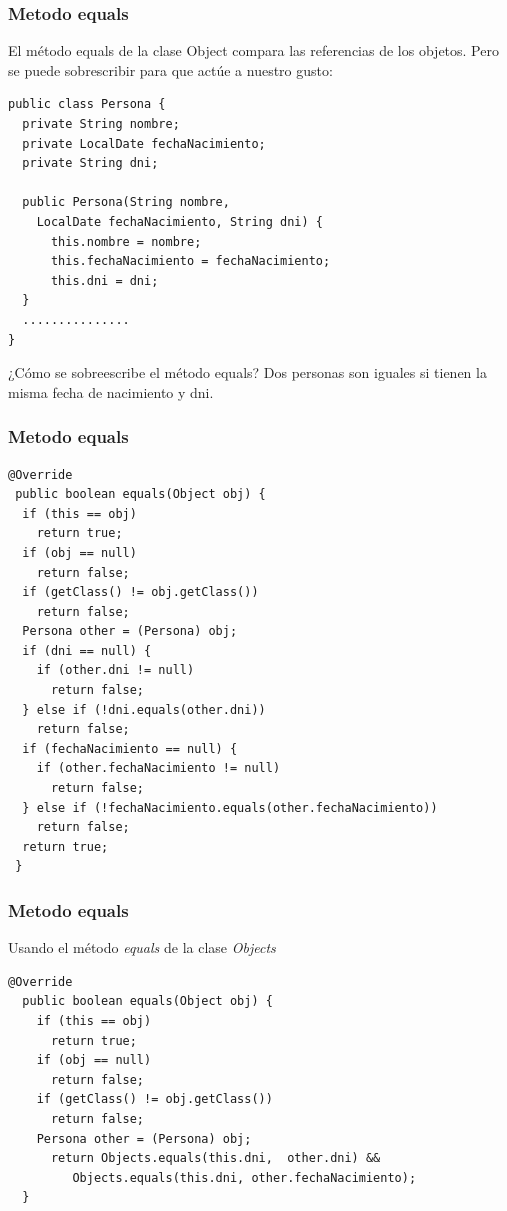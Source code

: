 \documentclass{beamer}
\begin{document}
\begin{frame}[fragile]
\frametitle{Metodo equals}
El método \alert{equals} de la clase Object compara las referencias de los objetos. Pero se puede sobrescribir para que actúe a nuestro gusto:
\pause
\begin{verbatim}
public class Persona {
  private String nombre;
  private LocalDate fechaNacimiento;
  private String dni;
	
  public Persona(String nombre, 
    LocalDate fechaNacimiento, String dni) {
      this.nombre = nombre;
      this.fechaNacimiento = fechaNacimiento;
      this.dni = dni;
  }
  ...............	
}
\end{verbatim}
\pause
¿Cómo se sobreescribe el método equals? Dos personas son iguales si tienen la misma fecha de nacimiento y dni.
\end{frame}


\begin{frame}[fragile]
\frametitle{Metodo equals}
\begin{footnotesize}
\begin{verbatim}
@Override
 public boolean equals(Object obj) {
  if (this == obj)
    return true;
  if (obj == null)
    return false;
  if (getClass() != obj.getClass())
    return false;
  Persona other = (Persona) obj;
  if (dni == null) {
    if (other.dni != null)
      return false;
  } else if (!dni.equals(other.dni))
    return false;
  if (fechaNacimiento == null) {
    if (other.fechaNacimiento != null)
      return false;
  } else if (!fechaNacimiento.equals(other.fechaNacimiento))
    return false;
  return true;
 }
\end{verbatim}
\end{footnotesize}
\end{frame}

\begin{frame}[fragile]
\frametitle{Metodo equals}
Usando el método \emph{equals} de la clase \emph{Objects}
\begin{verbatim}
@Override
  public boolean equals(Object obj) {
    if (this == obj)
      return true;
    if (obj == null)
      return false;
    if (getClass() != obj.getClass())
      return false;
    Persona other = (Persona) obj;
      return Objects.equals(this.dni,  other.dni) &&
         Objects.equals(this.dni, other.fechaNacimiento);
  }
\end{verbatim}
\end{frame}
\end{document}
